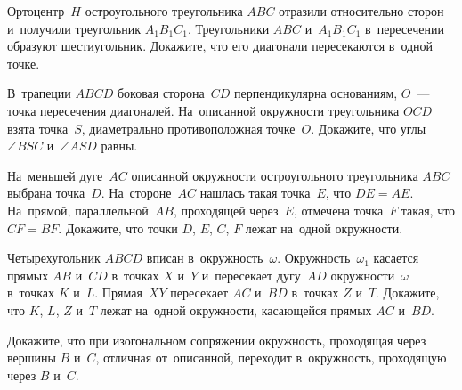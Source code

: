 \begin{problems}
\item
Ортоцентр~$H$ остроугольного треугольника $ABC$ отразили относительно сторон
и~получили треугольник $A_1 B_1 C_1$.
Треугольники $ABC$ и~$A_1 B_1 C_1$ в~пересечении образуют шестиугольник.
Докажите, что его диагонали пересекаются в~одной точке.

\item
В~трапеции $ABCD$ боковая сторона~$CD$ перпендикулярна основаниям,
$O$~— точка пересечения диагоналей.
На~описанной окружности треугольника $OCD$ взята точка~$S$, диаметрально
противоположная точке~$O$.
Докажите, что углы $\angle BSC$ и~$\angle ASD$ равны.

\item
На~меньшей дуге~$AC$ описанной окружности остроугольного треугольника $ABC$
выбрана точка~$D$.
На~стороне~$AC$ нашлась такая точка~$E$, что $DE = AE$.
На~прямой, параллельной~$AB$, проходящей через~$E$, отмечена точка~$F$ такая,
что $CF = BF$.
Докажите, что точки $D$, $E$, $C$, $F$ лежат на~одной окружности.

\item
Четырехугольник $ABCD$ вписан в~окружность~$\omega$.
Окружность~$\omega_1$ касается прямых $AB$ и~$CD$ в~точках $X$ и~$Y$
и~пересекает дугу~$AD$ окружности~$\omega$ в~точках $K$ и~$L$.
Прямая~$XY$ пересекает $AC$ и~$BD$ в~точках $Z$ и~$T$.
Докажите, что $K$, $L$, $Z$ и~$T$ лежат на~одной окружности, касающейся
прямых $AC$ и~$BD$.

\item
Докажите, что при изогональном сопряжении окружность, проходящая через
вершины $B$ и~$C$, отличная от~описанной, переходит в~окружность, проходящую
через $B$ и~$C$.

\end{problems}

